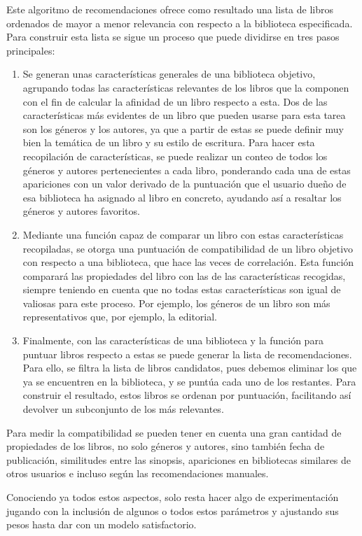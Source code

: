Este algoritmo de recomendaciones ofrece como resultado una lista de libros ordenados de mayor a menor relevancia con respecto a la biblioteca especificada. Para construir esta lista se sigue un proceso que puede dividirse en tres pasos principales:

\begin{enumerate}
    \item Se generan unas características generales de una biblioteca objetivo, agrupando todas las características relevantes de los libros que la componen con el fin de calcular la afinidad de un libro respecto a esta. Dos de las características más evidentes de un libro que pueden usarse para esta tarea son los géneros y los autores, ya que a partir de estas se puede definir muy bien la temática de un libro y su estilo de escritura. Para hacer esta recopilación de características, se puede realizar un conteo de todos los géneros y autores pertenecientes a cada libro, ponderando cada una de estas apariciones con un valor derivado de la puntuación que el usuario dueño de esa biblioteca ha asignado al libro en concreto, ayudando así a resaltar los géneros y autores favoritos.
    \item Mediante una función capaz de comparar un libro con estas características recopiladas, se otorga una puntuación de compatibilidad de un libro objetivo con respecto a una biblioteca, que hace las veces de correlación. Esta función comparará las propiedades del libro con las de las características recogidas, siempre teniendo en cuenta que no todas estas características son igual de valiosas para este proceso. Por ejemplo, los géneros de un libro son más representativos que, por ejemplo, la editorial.
    \item Finalmente, con las características de una biblioteca y la función para puntuar libros respecto a estas se puede generar la lista de recomendaciones. Para ello, se filtra la lista de libros candidatos, pues debemos eliminar los que ya se encuentren en la biblioteca, y se puntúa cada uno de los restantes. Para construir el resultado, estos libros se ordenan por puntuación, facilitando así devolver un subconjunto de los más relevantes.
\end{enumerate}

Para medir la compatibilidad se pueden tener en cuenta una gran cantidad de propiedades de los libros, no solo géneros y autores, sino también fecha de publicación, similitudes entre las sinopsis, apariciones en bibliotecas similares de otros usuarios e incluso según las recomendaciones manuales.

Conociendo ya todos estos aspectos, solo resta hacer algo de experimentación jugando con la inclusión de algunos o todos estos parámetros y ajustando sus pesos hasta dar con un modelo satisfactorio.